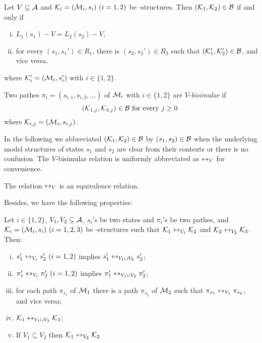 \documentclass{article}
\begin{document}
\begin{proposition}\label{Vbi:Equ}
Let $V\subseteq\cal A$
and ${\cal K}_i=({\cal M}_i,s_i)~(i=1,2)$ be \MPK-structures.
Then $({\cal K}_1,{\cal K}_2)\in\cal B$ if and only if
  \begin{enumerate}[(i)]
    \item $L_1(s_1)- V = L_2(s_2)-V$,
    \item for every $(s_1,s_1')\in R_1$, there is $(s_2,s_2')\in R_2$
    such that $({\cal K}_1',{\cal K}_2')\in {\cal B}$, and vice versa.
   \end{enumerate}
 where ${\cal K}_i'=({\cal M}_i,s_i')$ with $i\in\{1,2\}$.
\end{proposition}


Two pathes $\pi_i=(s_{i,1},s_{i,2},\ldots)$ of ${\cal M}_i$ with $i\in \{1,2\}$
 are $V$-{\em bisimular} if
 \[({\cal K}_{1,j},{\cal K}_{2,j})\in {\cal B} \mbox { for every $j\ge 0$ }\]
 where ${\cal K}_{i,j}=({\cal M}_i,s_{i,j})$.

 In the following we abbreviated $({\cal K}_1,{\cal K}_2)\in \cal B$
 by $(s_1,s_2)\in \cal B$
 when the underlying model structures of states $s_1$ and $s_2$ are clear from their contexts
 or there is no confusion.
  The $V$-bisimular relation is uniformly abbreviated as $\leftrightarrow_V$ for convenience.%
\begin{lemma}\label{lem:equive}
  The relation $\leftrightarrow_V$ is an equivalence relation.
\end{lemma}

Besides, we have the following properties:
\begin{proposition}\label{div}
Let $i\in \{1,2\}$, $V_1,V_2\subseteq\cal A$, $s_i'$s be two states and
  $\pi_i'$s be two pathes,
and ${\cal K}_i=({\cal M}_i,s_i)~(i=1,2,3)$ be \MPK-structures
 such that
${\cal K}_1\leftrightarrow_{V_1}{\cal K}_2$ and ${\cal K}_2\leftrightarrow_{V_2}{\cal K}_3$.
 Then:
 \begin{enumerate}[(i)]
   \item $s_1'\leftrightarrow_{V_i}s_2'~(i=1,2)$ implies $s_1'\leftrightarrow_{V_1\cup V_2}s_2'$;
   \item $\pi_1'\leftrightarrow_{V_i}\pi_2'~(i=1,2)$ implies $\pi_1'\leftrightarrow_{V_1\cup V_2}\pi_2'$;
   \item for each path $\pi_{s_1}$ of ${\cal M}_1$ there is a path $\pi_{s_2}$  of ${\cal M}_2$ such that $\pi_{s_1} \leftrightarrow_{V_1} \pi_{s_2}$, and vice versa;
   \item ${\cal K}_1\leftrightarrow_{V_1\cup V_2}{\cal K}_3$;
   \item If $V_1 \subseteq V_2$ then ${\cal K}_1 \leftrightarrow_{V_2} {\cal K}_2$
 \end{enumerate}
\end{proposition}
\end{document}
